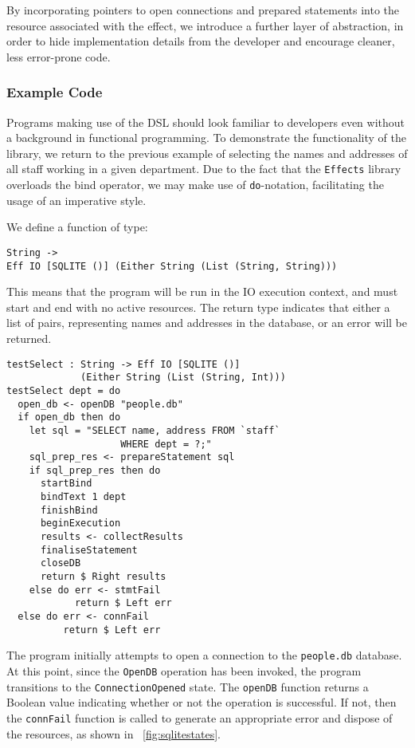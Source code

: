 \documentclass[preprint]{sigplanconf}
\begin{document}
By incorporating pointers to open connections and prepared statements into the resource associated with the effect, we introduce a further layer of abstraction, in order to hide implementation details from the developer and encourage cleaner, less error-prone code. 

\subsubsection{Example Code}
Programs making use of the DSL should look familiar to developers even without a background in functional programming. To demonstrate the functionality of the library, we return to the previous example of selecting the names and addresses of all staff working in a given department. Due to the fact that the \texttt{Effects} library overloads the bind operator, we may make use of \texttt{do}-notation, facilitating the usage of an imperative style.

We define a function of type:
\begin{Verbatim}
String ->
Eff IO [SQLITE ()] (Either String (List (String, String)))
\end{Verbatim}
This means that the program will be run in the IO execution context, and must start and end with no active resources. The return type indicates that either a list of  pairs, representing names and addresses in the database, or an error will be returned. 
\begin{Verbatim}
testSelect : String -> Eff IO [SQLITE ()] 
             (Either String (List (String, Int)))
testSelect dept = do
  open_db <- openDB "people.db"
  if open_db then do
    let sql = "SELECT name, address FROM `staff` 
                    WHERE dept = ?;"
    sql_prep_res <- prepareStatement sql
    if sql_prep_res then do 
      startBind
      bindText 1 dept
      finishBind
      beginExecution
      results <- collectResults
      finaliseStatement
      closeDB
      return $ Right results
    else do err <- stmtFail
            return $ Left err
  else do err <- connFail
          return $ Left err 
\end{Verbatim}
The program initially attempts to open a connection to the \texttt{people.db} database. At this point, since the \texttt{OpenDB} operation has been invoked, the program transitions to the \texttt{ConnectionOpened} state. The \texttt{openDB} function returns a Boolean value indicating whether or not the operation is successful. If not, then the \texttt{connFail} function is called to generate an appropriate error and dispose of the resources, as shown in ~\ref{fig:sqlitestates}.
\end{document}
